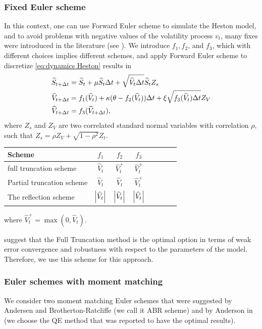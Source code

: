 \subsubsection{Fixed Euler scheme}\label{sec:Discretization of Heston model with a non smooth transformations for the volatility process}
In this context, one can use Forward Euler scheme to simulate the Heston model, and to avoid  problems with negative values of the volatility process $v_t$, many fixes  were introduced in the literature (see \cite{lord2010comparison}). We introduce $f_1, f_2$, and $f_3$, which with different choices implies different schemes, and   apply Forward Euler scheme to discretize \ref{eq:dynamics Heston}  results in
\begin{align}\label{eq:FE_Heston_discrete}
\widehat{S}_{t+\Delta t}&= \widehat{S}_t +\mu \widehat{S}_t \Delta t+\sqrt{\widehat{V}_t \Delta t} \widehat{S}_t Z_s \nonumber\\
\widehat{V}_{t+\Delta t}&=f_1(\widehat{V}_t)+\kappa (\theta-f_2(\widehat{V}_t)) \Delta t+\xi \sqrt{f_3(\widehat{V}_t) \Delta t} Z_V \nonumber\\
\widehat{V}_{t+\Delta t}&=f_3(\widehat{V}_{t+\Delta t}) ,
\end{align}
where $Z_s$ and $Z_V$  are two correlated standard normal variables with correlation $\rho$, such that $Z_s=\rho Z_V+\sqrt{1-\rho^2} Z_t$. 

\FloatBarrier
\begin{table}[h!]
	\centering
	\begin{tabular}{l*{6}{c}r}
		\toprule[1.5pt]
	Scheme &  $f_1$& $f_2$  & $f_3$     \\
	\hline
	full truncation scheme & $\hat{V}_t$ &  $\hat{V}_t^+$&$\hat{V}_t^+$\\
	Partial truncation scheme & $\hat{V}_t$ &  $\hat{V}_t$&$\hat{V}_t^+$\\
	The reflection scheme  &$\left\lvert\widehat{V}_t\right\rvert$ & $\left\lvert\widehat{V}_t\right\rvert$& $\left\lvert\widehat{V}_t\right\rvert$\\
			\bottomrule[1.25pt]
	\end{tabular}
	\label{Numerical schemes for CIR process}
\end{table}
\FloatBarrier
where  $\hat{V}_t^+=\max(0,\hat{V}_t)$.

\cite{lord2010comparison} suggest that the Full Truncation method is the optimal option in terms of weak error convergence and robustness with respect to the parameters of the model. Therefore,  we use this scheme for this approach. 

\subsubsection{Euler schemes with moment matching}\label{sec:Euler schemes with moment matching}
We consider two moment matching Euler schemes that were suggested by Andersen and Brotherton-Ratcliffe \cite{andersen2005extended} (we call it ABR scheme) and by Anderson in \cite{andersen2007efficient} (we choose the QE method that was reported to have the optimal results). 
